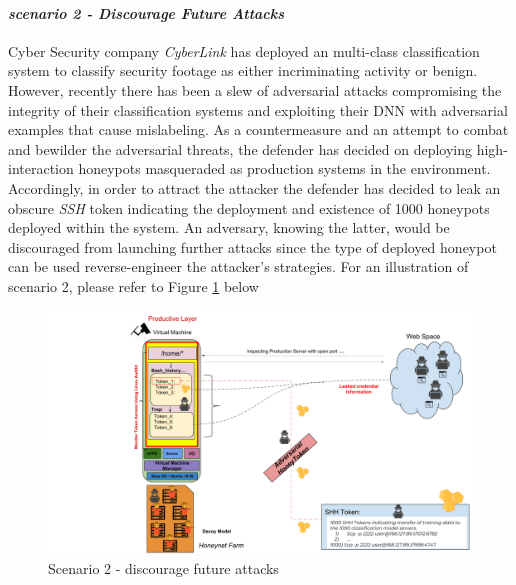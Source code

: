 \documentclass[grad,lot,lof,11pt,oneside,onehalfspace]{RUthesis}
\begin{document}
\paragraph{\textit{scenario 2 - Discourage Future Attacks}}
Cyber Security company \textit{CyberLink} has deployed an multi-class classification system to classify security footage as either incriminating activity or benign. However, recently there has been a slew of adversarial attacks compromising the integrity of their classification systems and exploiting their DNN with adversarial examples that cause mislabeling. As a countermeasure and an attempt to combat and bewilder the adversarial threats, the defender has decided on deploying high-interaction honeypots masqueraded as production systems in the environment. Accordingly, in order to attract the attacker 
the defender has decided to leak an obscure \textit{SSH} token indicating the deployment and existence of 1000 honeypots deployed within the system. An adversary, knowing the latter, would be discouraged from launching further attacks since the type of deployed honeypot can be used reverse-engineer the attacker's strategies. For an illustration of scenario 2, please refer to Figure \ref*{fig:Scenario2} below
\begin{figure}[tbh!]
\centering
\includegraphics[width=0.7\linewidth]{"Images/Chapter 5/Scenario2"}
\caption{Scenario 2 - discourage future attacks}
\label{fig:Scenario2}
\end{figure}
\end{document}
